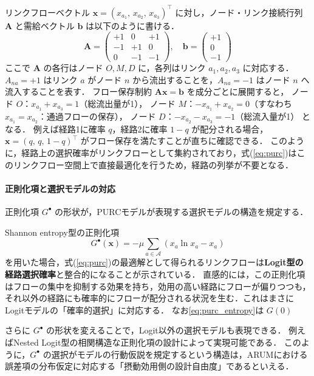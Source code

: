 リンクフローベクトル $\bm{x} = (x_{a_1},\, x_{a_2},\, x_{a_3})^\top$ に対し，ノード・リンク接続行列 $\bm{A}$ と需給ベクトル $\bm{b}$ は以下のように書ける．
\begin{equation}\label{eq:purc_example}
  \bm{A} =
  \begin{pmatrix}
    +1 &  0 & +1 \\
    -1 & +1 &  0 \\
     0 & -1 & -1
  \end{pmatrix}, \quad
  \bm{b} =
  \begin{pmatrix}
    +1 \\ 0 \\ -1
  \end{pmatrix}
\end{equation}
ここで $\bm{A}$ の各行はノード $O, M, D$ に，各列はリンク $a_1, a_2, a_3$ に対応する．
$A_{na} = +1$ はリンク $a$ がノード $n$ から流出することを，$A_{na} = -1$ はノード $n$ へ流入することを表す．
フロー保存制約 $\bm{A}\bm{x} = \bm{b}$ を成分ごとに展開すると，
ノード $O$：$x_{a_1} + x_{a_3} = 1$（総流出量が1），
ノード $M$：$-x_{a_1} + x_{a_2} = 0$（すなわち $x_{a_1} = x_{a_2}$：通過フローの保存），
ノード $D$：$-x_{a_2} - x_{a_3} = -1$（総流入量が1）
となる．
例えば経路1に確率 $q$，経路2に確率 $1-q$ が配分される場合，$\bm{x} = (q,\, q,\, 1-q)^\top$ がフロー保存を満たすことが直ちに確認できる．
このように，経路上の選択確率がリンクフローとして集約されており，式(\ref{eq:purc})はこのリンクフロー空間上で直接最適化を行うため，経路の列挙が不要となる．

\paragraph{正則化項と選択モデルの対応}
正則化項 $G^\bullet$ の形状が，PURCモデルが表現する選択モデルの構造を規定する．

Shannon entropy型の正則化項
\begin{equation}\label{eq:purc_entropy}
  G^\bullet(\bm{x}) = -\mu \sum_{a \in \mathcal{A}} (x_a \ln x_a - x_a)
\end{equation}
を用いた場合，式(\ref{eq:purc})の最適解として得られるリンクフローは\textbf{Logit型の経路選択確率}と整合的になることが示されている．
直感的には，この正則化項はフローの集中を抑制する効果を持ち，効用の高い経路にフローが偏りつつも，それ以外の経路にも確率的にフローが配分される状況を生む．これはまさにLogitモデルの「確率的選択」に対応する．
なお\eqref{eq:purc_entropy}は $G(0)$ 

さらに $G^\bullet$ の形状を変えることで，Logit以外の選択モデルも表現できる．
例えばNested Logit型の相関構造な正則化項の設計によって実現可能である．
このように，$G^\bullet$ の選択がモデルの行動仮説を規定するという構造は，ARUMにおける誤差項の分布仮定に対応する「摂動効用側の設計自由度」であるといえる．

